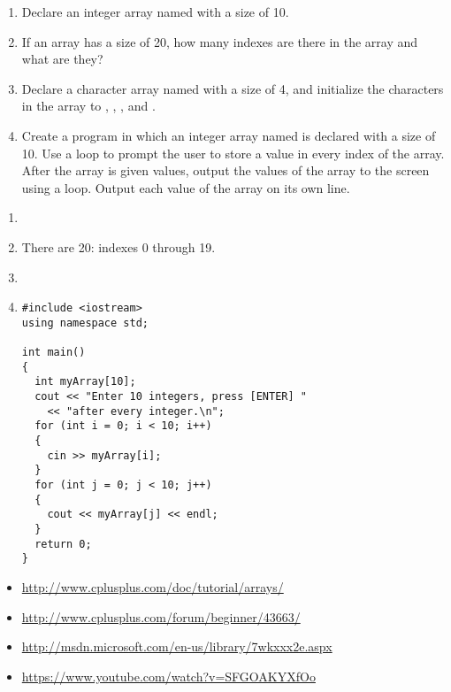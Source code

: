 \begin{enumerate}
	\item Declare an integer array named  with a size of 10.
  \item If an array has a size of 20, how many indexes are there in the array and what are they?
  \item Declare a character array named  with a size of 4, and initialize the characters in the array to , , , and . 
  \item 
  Create a program in which an integer array named  is declared with a size of 10. 
  Use a  loop to prompt the user to store a value in every index of the array. 
  After the array is given values, output the values of the array to the screen using a  loop. 
  Output each value of the array on its own line.
\end{enumerate}


\begin{enumerate}
	\item {}
  \item There are 20: indexes 0 through 19.
  \item {}
  \item 
\noindent\begin{minipage}{\linewidth}\begin{lstlisting}
#include <iostream>
using namespace std;

int main()
{
  int myArray[10];
  cout << "Enter 10 integers, press [ENTER] "
    << "after every integer.\n";
  for (int i = 0; i < 10; i++)
  {
    cin >> myArray[i];
  }
  for (int j = 0; j < 10; j++)
  {
    cout << myArray[j] << endl;
  }
  return 0;
}
\end{lstlisting}\end{minipage}
\end{enumerate}



\begin{itemize}
\item \url{http://www.cplusplus.com/doc/tutorial/arrays/}
\item \url{http://www.cplusplus.com/forum/beginner/43663/}
\item \url{http://msdn.microsoft.com/en-us/library/7wkxxx2e.aspx}
\item \url{https://www.youtube.com/watch?v=SFGOAKYXfOo}
\end{itemize}	